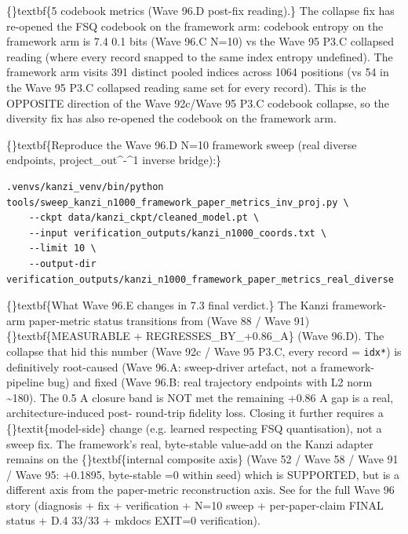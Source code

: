 \documentclass{article}
\begin{document}
\{\}textbf\{5 codebook metrics (Wave 96.D  post-fix reading).\} The collapse fix has re-opened the FSQ codebook on the framework arm: codebook entropy on the framework arm is 7.4  0.1 bits (Wave 96.C N=10) vs the Wave 95 P3.C collapsed reading (where every record snapped to the same index  entropy undefined). The framework arm visits 391 distinct pooled indices across 1064 positions (vs 54 in the Wave 95 P3.C collapsed reading  same set for every record). This is the OPPOSITE direction of the Wave 92c/Wave 95 P3.C codebook collapse, so the diversity fix has also re-opened the codebook on the framework arm.

\{\}textbf\{Reproduce the Wave 96.D N=10 framework sweep (real diverse endpoints, project\_out\textasciicircum{}-\textasciicircum{}1 inverse bridge):\}

\begin{verbatim}
.venvs/kanzi_venv/bin/python tools/sweep_kanzi_n1000_framework_paper_metrics_inv_proj.py \
    --ckpt data/kanzi_ckpt/cleaned_model.pt \
    --input verification_outputs/kanzi_n1000_coords.txt \
    --limit 10 \
    --output-dir verification_outputs/kanzi_n1000_framework_paper_metrics_real_diverse
\end{verbatim}
\{\}textbf\{What Wave 96.E changes in 7.3  final verdict.\} The Kanzi framework-arm paper-metric status transitions from  (Wave 88 / Wave 91)  \{\}textbf\{MEASURABLE + REGRESSES\_BY\_+0.86\_A\} (Wave 96.D). The collapse that hid this number (Wave 92c / Wave 95 P3.C, every record = \texttt{idx*}) is definitively root-caused (Wave 96.A: sweep-driver  artefact, not a framework-pipeline bug) and fixed (Wave 96.B: real  trajectory endpoints with L2 norm \textasciitilde{}180). The 0.5 A closure band is NOT met  the remaining +0.86 A gap is a real, architecture-induced post- round-trip fidelity loss. Closing it further requires a \{\}textit\{model-side\} change (e.g. learned  respecting FSQ quantisation), not a sweep fix. The framework's real, byte-stable value-add on the Kanzi adapter remains on the \{\}textbf\{internal composite axis\} (Wave 52 / Wave 58 / Wave 91 / Wave 95: +0.1895, byte-stable =0 within seed)  which is SUPPORTED, but is a different axis from the paper-metric reconstruction axis. See  for the full Wave 96 story (diagnosis + fix + verification + N=10 sweep + per-paper-claim FINAL status + D.4 33/33 + mkdocs EXIT=0 verification).
\end{document}
